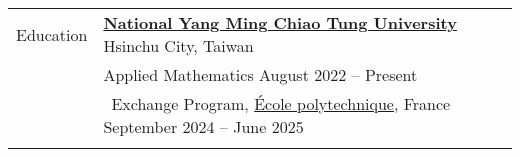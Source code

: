 \documentclass[letterpaper, 11pt]{article}
\begin{document}
\setlength{\tabcolsep}{8pt}
\vspace{-1.5em}
\begin{center}
    \begin{longtable}{p{0.76in}p{5.93in}}

        
        
        
        \textcolor{OliveGreen}{Education} 
        & \href{https://www.nycu.edu.tw/nycu/en/index}{\textbf{National Yang Ming Chiao Tung University}} \hfill Hsinchu City, Taiwan \\ 
        & Applied Mathematics 
            \hfill August 2022 -- Present \\
        & \qquad \  Exchange Program, \href{https://www.polytechnique.edu}{\'Ecole polytechnique}, France \hfill September 2024 -- June 2025 \\
        & \\
        
        
        

\end{longtable}
\end{center}
\end{document}

